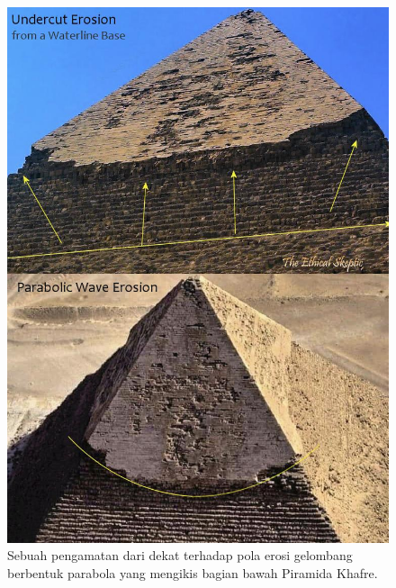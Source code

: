 \documentclass[10pt,twocolumn,letterpaper]{article}
\begin{document}
\begin{figure}[H]
\begin{center}
   \includegraphics[width=1\linewidth]{wave.jpg}
\end{center}
   \caption{Sebuah pengamatan dari dekat terhadap pola erosi gelombang berbentuk parabola yang mengikis bagian bawah Piramida Khafre\cite{27}.}
\label{fig:19}
\label{fig:onecol}
\end{figure}
\end{document}
